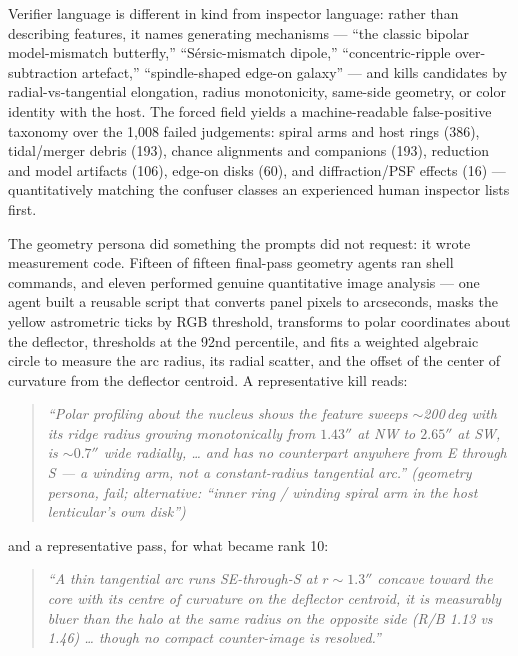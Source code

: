 \documentclass[11pt,letterpaper]{article}
\begin{document}
Verifier language is different in kind from inspector language: rather than
describing features, it names generating mechanisms --- ``the classic bipolar
model-mismatch butterfly,'' ``S\'ersic-mismatch dipole,'' ``concentric-ripple
over-subtraction artefact,'' ``spindle-shaped edge-on galaxy'' --- and kills
candidates by radial-vs-tangential elongation, radius monotonicity, same-side
geometry, or color identity with the host. The forced  field
yields a machine-readable false-positive taxonomy over the 1{,}008 failed
judgements: spiral arms and host rings (386), tidal/merger debris (193),
chance alignments and companions (193), reduction and model artifacts (106),
edge-on disks (60), and diffraction/PSF effects (16) --- quantitatively
matching the confuser classes an experienced human inspector lists first.

The geometry persona did something the prompts did not request: it wrote
measurement code. Fifteen of fifteen final-pass geometry agents ran shell
commands, and eleven performed genuine quantitative image analysis --- one
agent built a reusable script that converts panel pixels to arcseconds, masks
the yellow astrometric ticks by RGB threshold, transforms to polar
coordinates about the deflector, thresholds at the 92nd percentile, and fits
a weighted algebraic circle to measure the arc radius, its radial scatter,
and the offset of the center of curvature from the deflector centroid.
A representative kill reads:

\begin{quote}\small\itshape
``Polar profiling about the nucleus shows the feature sweeps $\sim$200\,deg
with its ridge radius growing monotonically from $1.43''$ at NW to $2.65''$
at SW, is $\sim$$0.7''$ wide radially, \ldots{} and has no counterpart
anywhere from E through S --- a winding arm, not a constant-radius tangential
arc.'' \normalfont(geometry persona, fail; alternative: ``inner ring /
winding spiral arm in the host lenticular's own disk'')
\end{quote}

\noindent and a representative pass, for what became rank 10:

\begin{quote}\small\itshape
``A thin tangential arc runs SE-through-S at $r\sim1.3''$ concave toward the
core with its centre of curvature on the deflector centroid, it is measurably
bluer than the halo at the same radius on the opposite side (R/B 1.13 vs
1.46) \ldots{} though no compact counter-image is resolved.''
\end{quote}
\end{document}
